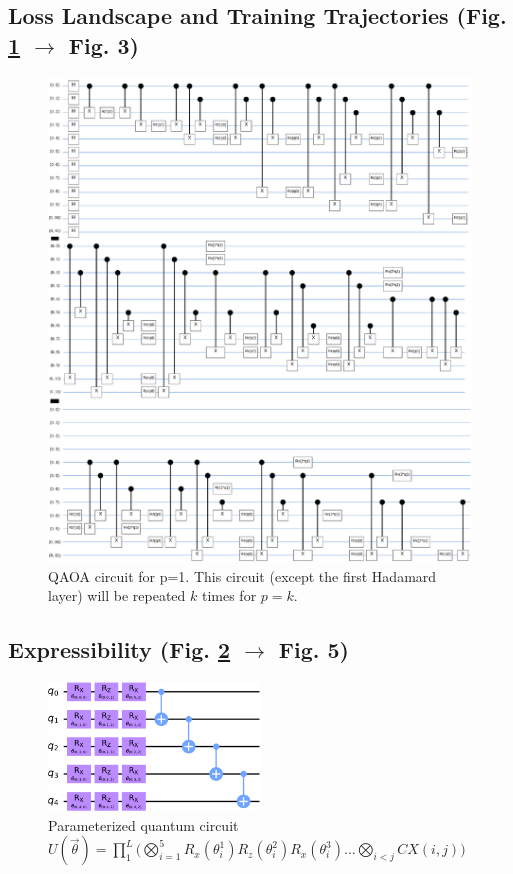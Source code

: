 \subsection{Loss Landscape and Training Trajectories (Fig. \ref{fig:qaoa-circuit} $\rightarrow$ Fig. 3)}
\begin{figure}[!ht]
    \centering
    \includegraphics[width=\textwidth]{figures/qleet/qaoa-circuit.pdf}
    \caption[QAOA Circuit for p=1]{QAOA circuit for p=1. This circuit (except the first Hadamard layer) will be repeated $k$ times for $p=k$.}
    \label{fig:qaoa-circuit}
\end{figure}

\subsection{Expressibility (Fig. \ref{fig:expr-circuit} $\rightarrow$ Fig. 5)}
\begin{figure}[!ht]
    \centering
    \includegraphics[width=0.5\textwidth]{figures/qleet/expr_circuit.pdf}
    \caption[Parameterized Quantum Circuit for a Unitary $U_1(\theta)$.]{Parameterized quantum circuit $U(\vec{\theta}) =  \prod_{1}^{L}\big(\bigotimes_{i=1}^{5}R_x(\theta_i^1)R_z(\theta_i^2)R_x(\theta_i^3) \ldots \bigotimes_{i<j}CX(i, j)\big)$}
    \label{fig:expr-circuit}
\end{figure}



